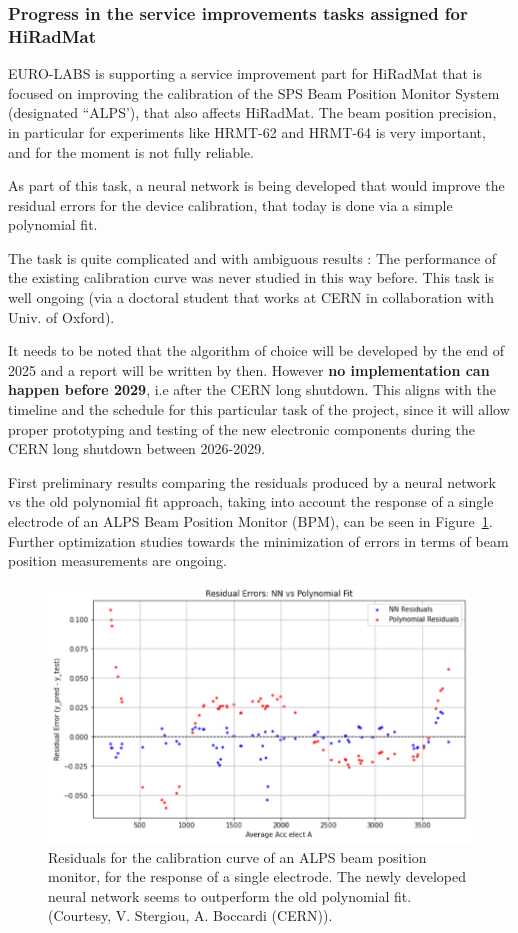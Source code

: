 \subsubsection*{Progress in the service improvements tasks assigned for HiRadMat}

EURO-LABS is supporting a service improvement part for HiRadMat that is focused on improving the calibration of the SPS Beam Position Monitor System (designated ``ALPS'), that also affects HiRadMat. The beam position precision, in particular for experiments like HRMT-62 and HRMT-64 is very important, and for the moment is not fully reliable. 

As part of this task, a neural network is being developed that would improve the residual errors for the device calibration, that today is done via a simple polynomial fit. 

The task is quite complicated and with ambiguous results : The performance of the existing calibration curve was never studied in this way before. This task is well ongoing (via a doctoral student that works at CERN in collaboration with Univ. of Oxford). 

It needs to be noted that the algorithm of choice will be developed by the end of 2025 and a report will be written by then. However \textbf{no implementation can happen before 2029}, i.e after the CERN long shutdown. This aligns with the timeline and the schedule for this particular task of the project, since it will allow proper prototyping and testing of the new electronic components during the CERN long shutdown between 2026-2029. 

First preliminary results comparing the residuals produced by a neural network vs the old polynomial fit approach, taking into account the response of a single electrode of an ALPS Beam Position Monitor (BPM), can be seen in Figure~\ref{fig:hiradmat_SI}. Further optimization studies towards the minimization of errors in terms of beam position measurements are ongoing.
\begin{figure}[!h]
    \centering
    \includegraphics[width=0.75\linewidth]{graphics/hiradmat_SI.png}
    \caption{Residuals for the calibration curve of an ALPS beam position monitor, for the response of a single electrode. The newly developed neural network seems to outperform the old polynomial fit. (Courtesy, V. Stergiou, A. Boccardi (CERN)).}
    \label{fig:hiradmat_SI}
\end{figure}


